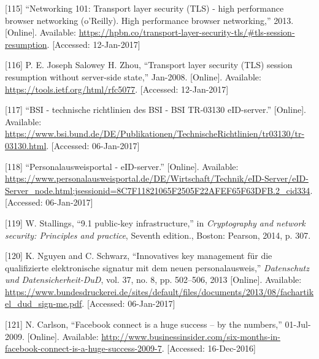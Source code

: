 \documentclass[12pt,english,a4paper,titlepage,cleardoublepage=empty,dottedtoc]{report}
\begin{document}
\hypertarget{ref-book_2013_networking-101_tls-session-resumption}{}
{[}115{]} ``Networking 101: Transport layer security (TLS) - high
performance browser networking (o'Reilly). High performance browser
networking,'' 2013. {[}Online{]}. Available:
\url{https://hpbn.co/transport-layer-security-tls/\#tls-session-resumption}.
{[}Accessed: 12-Jan-2017{]}

\hypertarget{ref-web_spec_tls-session-ticket-resumption}{}
{[}116{]} P. E. Joseph Salowey H. Zhou, ``Transport layer security (TLS)
session resumption without server-side state,'' Jan-2008. {[}Online{]}.
Available: \url{https://tools.ietf.org/html/rfc5077}. {[}Accessed:
12-Jan-2017{]}

\hypertarget{ref-web_bsi-spec_eid}{}
{[}117{]} ``BSI - technische richtlinien des BSI - BSI TR-03130
eID-server.'' {[}Online{]}. Available:
\url{https://www.bsi.bund.de/DE/Publikationen/TechnischeRichtlinien/tr03130/tr-03130.html}.
{[}Accessed: 06-Jan-2017{]}

\hypertarget{ref-web_2017_npa-eid-server}{}
{[}118{]} ``Personalausweisportal - eID-server.'' {[}Online{]}.
Available:
\url{https://www.personalausweisportal.de/DE/Wirtschaft/Technik/eID-Server/eID-Server_node.html;jsessionid=8C7F11821065F2505F22AFEF65F63DFB.2_cid334}.
{[}Accessed: 06-Jan-2017{]}

\hypertarget{ref-book_2014_chapter-10-5-asym-random-number-gen}{}
{[}119{]} W. Stallings, ``9.1 public-key infrastructure,'' in
\emph{Cryptography and network security: Principles and practice},
Seventh edition., Boston: Pearson, 2014, p. 307.

\hypertarget{ref-paper_2013-keymanangement-fuer-qes-mit-npa}{}
{[}120{]} K. Nguyen and C. Schwarz, ``Innovatives key management für die
qualifizierte elektronische signatur mit dem neuen personalausweis,''
\emph{Datenschutz und Datensicherheit-DuD}, vol. 37, no. 8, pp.
502--506, 2013 {[}Online{]}. Available:
\url{https://www.bundesdruckerei.de/sites/default/files/documents/2013/08/fachartikel_dud_sign-me.pdf}.
{[}Accessed: 06-Jan-2017{]}

\hypertarget{ref-web_2009-success-of-facebook-connect}{}
{[}121{]} N. Carlson, ``Facebook connect is a huge success -- by the
numbers,'' 01-Jul-2009. {[}Online{]}. Available:
\url{http://www.businessinsider.com/six-months-in-facebook-connect-is-a-huge-success-2009-7}.
{[}Accessed: 16-Dec-2016{]}
\end{document}

